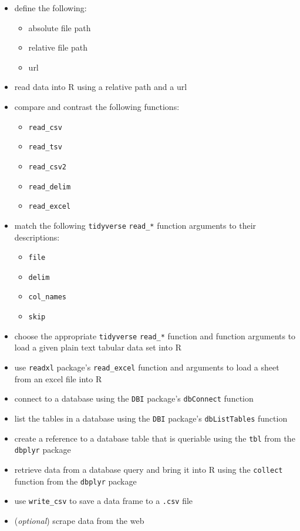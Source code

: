 \documentclass[
]{krantz}
\providecommand{\tightlist}{%
  \setlength{\itemsep}{0pt}\setlength{\parskip}{0pt}}
\begin{document}
\begin{itemize}
\item
  define the following:

  \begin{itemize}
  \tightlist
  \item
    absolute file path
  \item
    relative file path
  \item
    url
  \end{itemize}
\item
  read data into R using a relative path and a url
\item
  compare and contrast the following functions:

  \begin{itemize}
  \tightlist
  \item
    \texttt{read\_csv}
  \item
    \texttt{read\_tsv}
  \item
    \texttt{read\_csv2}
  \item
    \texttt{read\_delim}
  \item
    \texttt{read\_excel}
  \end{itemize}
\item
  match the following \texttt{tidyverse} \texttt{read\_*} function arguments to their descriptions:

  \begin{itemize}
  \tightlist
  \item
    \texttt{file}
  \item
    \texttt{delim}
  \item
    \texttt{col\_names}
  \item
    \texttt{skip}
  \end{itemize}
\item
  choose the appropriate \texttt{tidyverse} \texttt{read\_*} function and function arguments to load a given plain text tabular data set into R
\item
  use \texttt{readxl} package's \texttt{read\_excel} function and arguments to load a sheet from an excel file into R
\item
  connect to a database using the \texttt{DBI} package's \texttt{dbConnect} function
\item
  list the tables in a database using the \texttt{DBI} package's \texttt{dbListTables} function
\item
  create a reference to a database table that is queriable using the \texttt{tbl} from the \texttt{dbplyr} package
\item
  retrieve data from a database query and bring it into R using the \texttt{collect} function from the \texttt{dbplyr} package
\item
  use \texttt{write\_csv} to save a data frame to a \texttt{.csv} file
\item
  (\emph{optional}) scrape data from the web


\end{itemize}
\end{document}

